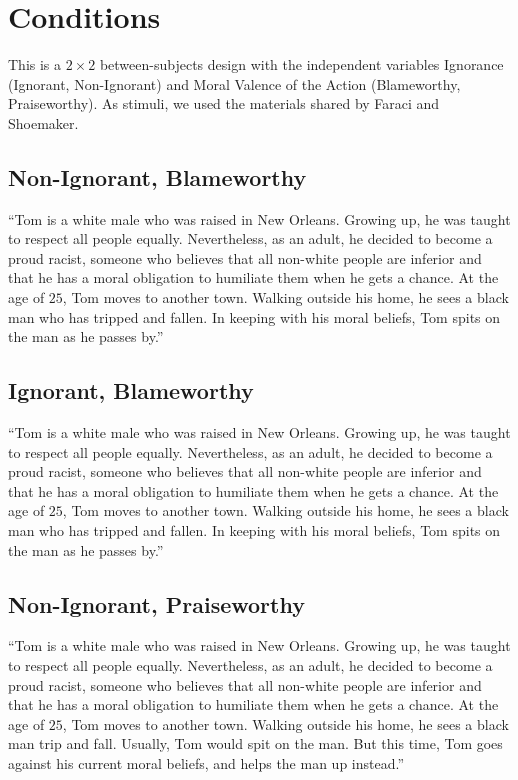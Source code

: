 \documentclass[scrarticle]{scrartcl}
\begin{document}
\section{Conditions}
This is a $2 \times 2$ between-subjects design with the independent variables Ignorance (Ignorant, Non-Ignorant) and Moral Valence of the Action (Blameworthy, Praiseworthy).
As stimuli, we used the materials shared by Faraci and Shoemaker.


\subsection*{Non-Ignorant, Blameworthy}
\enquote{Tom is a white male who was raised in New Orleans.
Growing up, he was taught to respect all people equally.
Nevertheless, as an adult, he decided to become a proud racist, someone who believes that all non-white people are inferior and that he has a moral obligation to humiliate them when he gets a chance.
At the age of $25$, Tom moves to another town.
Walking outside his home, he sees a black man who has tripped and fallen.
In keeping with his moral beliefs, Tom spits on the man as he passes by.}


\subsection*{Ignorant, Blameworthy}
\enquote{Tom is a white male who was raised in New Orleans.
Growing up, he was taught to respect all people equally.
Nevertheless, as an adult, he decided to become a proud racist, someone who believes that all non-white people are inferior and that he has a moral obligation to humiliate them when he gets a chance.
At the age of $25$, Tom moves to another town.
Walking outside his home, he sees a black man who has tripped and fallen.
In keeping with his moral beliefs, Tom spits on the man as he passes by.}


\subsection*{Non-Ignorant, Praiseworthy}
\enquote{Tom is a white male who was raised in New Orleans.
Growing up, he was taught to respect all people equally.
Nevertheless, as an adult, he decided to become a proud racist, someone who believes that all non-white people are inferior and that he has a moral obligation to humiliate them when he gets a chance.
At the age of $25$, Tom moves to another town.
Walking outside his home, he sees a black man trip and fall.
Usually, Tom would spit on the man.
But this time, Tom goes against his current moral beliefs, and helps the man up instead.}
\end{document}
